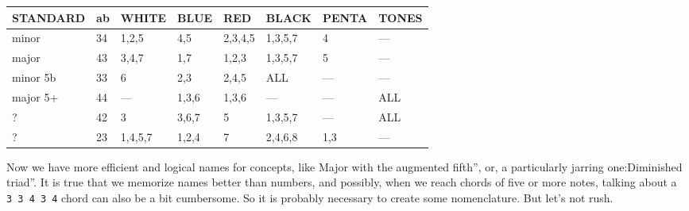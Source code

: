 \documentclass[]{report}
\begin{document}
\begin{table}[H]
\centering
\begin{tabular}{|l|l|l|l|l|l|l|l|}
\hline
STANDARD & ab & WHITE & BLUE & RED & BLACK & PENTA & TONES \\
\hline
minor& 34 & 1,2,5 & 4,5 & 2,3,4,5 & 1,3,5,7 & 4 & --- \\
\hline
major & 43 & 3,4,7 & 1,7 & 1,2,3 & 1,3,5,7 & 5 & --- \\
\hline
minor 5b & 33 & 6 & 2,3 & 2,4,5 & ALL & --- & --- \\
\hline
major 5+ & 44 & --- & 1,3,6 & 1,3,6 & --- & --- & ALL \\
\hline
? & 42 & 3 & 3,6,7 & 5 & 1,3,5,7 & --- & ALL \\
\hline
? & 23 & 1,4,5,7 & 1,2,4 & 7 & 2,4,6,8 & 1,3 & --- \\
\hline
\end{tabular}
\end{table}
Now we have more efficient and logical names for concepts, like Major with the augmented fifth'', or, a particularly jarring one:Diminished triad''.
It is true that we memorize names better than numbers, and possibly, when we reach chords of five or more notes, talking about a \texttt{3\ 3\ 4\ 3\ 4} chord can also be a bit cumbersome. So it is probably necessary to create some nomenclature. But let's not rush.
\end{document}
